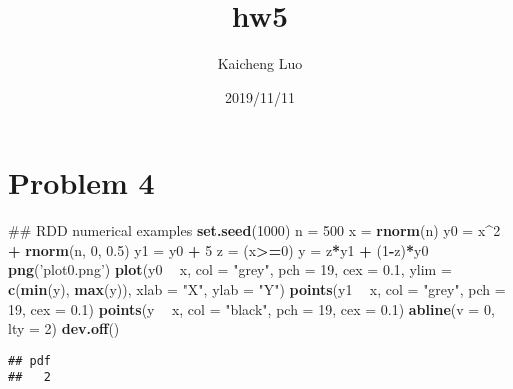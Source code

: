\documentclass[]{article}
\title{hw5}
\author{Kaicheng Luo}
\date{2019/11/11}
\newenvironment{Shaded}{\begin{snugshade}}{\end{snugshade}}
\newcommand{\KeywordTok}[1]{\textcolor[rgb]{0.13,0.29,0.53}{\textbf{#1}}}
\newcommand{\DataTypeTok}[1]{\textcolor[rgb]{0.13,0.29,0.53}{#1}}
\newcommand{\DecValTok}[1]{\textcolor[rgb]{0.00,0.00,0.81}{#1}}
\newcommand{\FloatTok}[1]{\textcolor[rgb]{0.00,0.00,0.81}{#1}}
\newcommand{\StringTok}[1]{\textcolor[rgb]{0.31,0.60,0.02}{#1}}
\newcommand{\OperatorTok}[1]{\textcolor[rgb]{0.81,0.36,0.00}{\textbf{#1}}}
\newcommand{\NormalTok}[1]{#1}
\begin{document}
\maketitle

\section*{Problem 4}

\begin{Shaded}
\begin{Highlighting}[]
\NormalTok{## RDD numerical examples}
\KeywordTok{set.seed}\NormalTok{(}\DecValTok{1000}\NormalTok{)}
\NormalTok{n   =}\StringTok{ }\DecValTok{500}
\NormalTok{x   =}\StringTok{ }\KeywordTok{rnorm}\NormalTok{(n)}
\NormalTok{y0  =}\StringTok{ }\NormalTok{x}\OperatorTok{^}\DecValTok{2} \OperatorTok{+}\StringTok{ }\KeywordTok{rnorm}\NormalTok{(n, }\DecValTok{0}\NormalTok{, }\FloatTok{0.5}\NormalTok{)}
\NormalTok{y1  =}\StringTok{ }\NormalTok{y0 }\OperatorTok{+}\StringTok{ }\DecValTok{5}
\NormalTok{z   =}\StringTok{ }\NormalTok{(x}\OperatorTok{>=}\DecValTok{0}\NormalTok{)}
\NormalTok{y   =}\StringTok{ }\NormalTok{z}\OperatorTok{*}\NormalTok{y1 }\OperatorTok{+}\StringTok{ }\NormalTok{(}\DecValTok{1}\OperatorTok{-}\NormalTok{z)}\OperatorTok{*}\NormalTok{y0}
\KeywordTok{png}\NormalTok{(}\StringTok{'plot0.png'}\NormalTok{)}
\KeywordTok{plot}\NormalTok{(y0 }\OperatorTok{~}\StringTok{ }\NormalTok{x, }\DataTypeTok{col =} \StringTok{"grey"}\NormalTok{, }\DataTypeTok{pch =} \DecValTok{19}\NormalTok{, }\DataTypeTok{cex =} \FloatTok{0.1}\NormalTok{,}
     \DataTypeTok{ylim =} \KeywordTok{c}\NormalTok{(}\KeywordTok{min}\NormalTok{(y), }\KeywordTok{max}\NormalTok{(y)),}
     \DataTypeTok{xlab =} \StringTok{"X"}\NormalTok{, }\DataTypeTok{ylab =} \StringTok{"Y"}\NormalTok{)}
\KeywordTok{points}\NormalTok{(y1 }\OperatorTok{~}\StringTok{ }\NormalTok{x, }\DataTypeTok{col =} \StringTok{"grey"}\NormalTok{, }\DataTypeTok{pch =} \DecValTok{19}\NormalTok{, }\DataTypeTok{cex =} \FloatTok{0.1}\NormalTok{)}
\KeywordTok{points}\NormalTok{(y }\OperatorTok{~}\StringTok{ }\NormalTok{x, }\DataTypeTok{col =} \StringTok{"black"}\NormalTok{, }\DataTypeTok{pch =} \DecValTok{19}\NormalTok{, }\DataTypeTok{cex =} \FloatTok{0.1}\NormalTok{)}
\KeywordTok{abline}\NormalTok{(}\DataTypeTok{v =} \DecValTok{0}\NormalTok{, }\DataTypeTok{lty =} \DecValTok{2}\NormalTok{)}
\KeywordTok{dev.off}\NormalTok{()}
\end{Highlighting}
\end{Shaded}

\begin{verbatim}
## pdf 
##   2
\end{verbatim}
\end{document}
